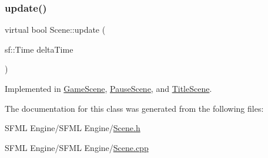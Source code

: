 \hypertarget{class_scene_a72683c984a1da2ce4f757705e93730f2}{}\label{class_scene_a72683c984a1da2ce4f757705e93730f2} 
\subsubsection{\texorpdfstring{update()}{update()}}
{\footnotesize\ttfamily virtual bool Scene\+::update (\begin{DoxyParamCaption}\item[{sf\+::\+Time}]{delta\+Time }\end{DoxyParamCaption})\hspace{0.3cm}{\ttfamily [pure virtual]}}



Implemented in \hyperlink{class_game_scene_ae54628d2f041bcad66242584b2db10d6}{Game\+Scene}, \hyperlink{class_pause_scene_a8504260009b4dfb2380785e938e60b4b}{Pause\+Scene}, and \hyperlink{class_title_scene_a17ce1b5b9f6f8ca44a6ed3326e9e5d0a}{Title\+Scene}.



The documentation for this class was generated from the following files\+:\begin{DoxyCompactItemize}
\item 
S\+F\+M\+L Engine/\+S\+F\+M\+L Engine/\hyperlink{_scene_8h}{Scene.\+h}\item 
S\+F\+M\+L Engine/\+S\+F\+M\+L Engine/\hyperlink{_scene_8cpp}{Scene.\+cpp}\end{DoxyCompactItemize}
